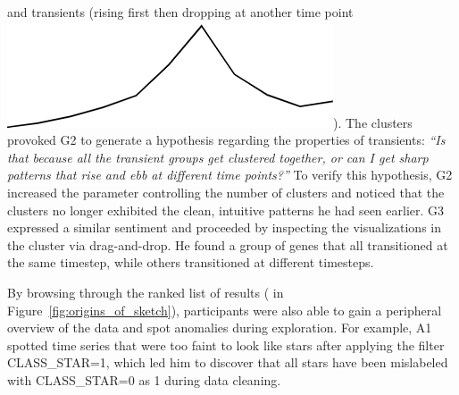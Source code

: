  and transients (rising first then dropping at another time point \includegraphics[width=2\baselineskip,keepaspectratio]{figures/transient.png}). The clusters provoked G2 to generate a hypothesis
 regarding the properties of transients:
 \textit{``Is that because all the transient groups
 get clustered together, or can I get sharp patterns
 that rise and ebb at different time points?''}
 To verify this hypothesis, G2 increased the parameter controlling the number of clusters and noticed that the clusters
 no longer exhibited the clean,
 intuitive patterns he had seen earlier.
 G3 expressed a similar sentiment and proceeded
 by inspecting the visualizations
 in the cluster via drag-and-drop.
 He found a group of genes that all transitioned
 at the same timestep, while others transitioned
 at different timesteps.
 \par By browsing through the ranked list of
 results ( in Figure~\ref{fig:origins_of_sketch}), participants were also able to
 gain a peripheral overview of the data
 and spot anomalies during exploration.
 For example, A1 spotted time series
 that were too faint to look like stars
 after applying the filter CLASS\_STAR=1,
 which led him to discover that all stars
 have been mislabeled with CLASS\_STAR=0 as 1 during data cleaning.
